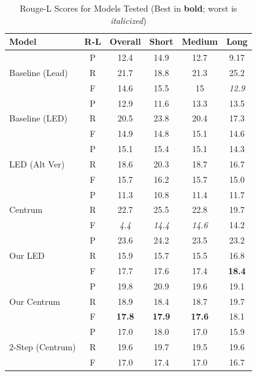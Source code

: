 \documentclass[12pt, twocolumn]{article}
\numberwithin{equation}{section}
\begin{document}
\begin{table}
    \centering
    \footnotesize
    \begin{tabular}{|p{1.5cm}|c|c|c|c|c|}
    \hline
        Model & R-L & Overall & Short & Medium & Long \\ \hline
        \multirow{3}{1.5cm}{Baseline (Lead)}
	& P & 12.4 & 14.9 & 12.7 & 9.17 \\ \cline{2-6}
        & R & 21.7 & 18.8 & 21.3 & 25.2 \\ \cline{2-6}
        & F & 14.6 & 15.5 & 15 & \textit{12.9} \\ \hline
        \multirow{3}{1.5cm}{Baseline (LED)} 
	& P & 12.9 & 11.6 & 13.3 & 13.5 \\ \cline{2-6}
        & R & 20.5 & 23.8 & 20.4 & 17.3 \\ \cline{2-6}
        & F & 14.9 & 14.8 & 15.1 & 14.6 \\ \hline
        \multirow{3}{1.5cm}{LED (Alt Ver)} 
	& P & 15.1 & 15.4 & 15.1 & 14.3 \\ \cline{2-6}
        & R & 18.6 & 20.3 & 18.7 & 16.7 \\ \cline{2-6}
        & F & 15.7 & 16.2 & 15.7 & 15.0 \\ \hline
        \multirow{3}{1.5cm}{Centrum} 
	& P & 11.3 & 10.8 & 11.4 & 11.7 \\ \cline{2-6}
        & R & 22.7 & 25.5 & 22.8 & 19.7 \\ \cline{2-6}
        & F & \textit{4.4} & \textit{14.4} & \textit{14.6} & 14.2 \\ \hline
        \multirow{3}{1.5cm}{Our LED} 
	& P & 23.6 & 24.2 & 23.5 & 23.2 \\ \cline{2-6}
        & R & 15.9 & 15.7 & 15.5 & 16.8 \\ \cline{2-6}
        & F & 17.7 & 17.6 & 17.4 & \textbf{18.4} \\ \hline
        \multirow{3}{1.5cm}{Our Centrum} 
	& P & 19.8 & 20.9 & 19.6 & 19.1 \\ \cline{2-6}
        & R & 18.9 & 18.4 & 18.7 & 19.7 \\ \cline{2-6}
        & F & \textbf{17.8} & \textbf{17.9} & \textbf{17.6} & 18.1 \\ \hline
        \multirow{3}{1.5cm}{2-Step (Centrum)} 
	& P & 17.0 & 18.0 & 17.0 & 15.9 \\ \cline{2-6}
        & R & 19.6 & 19.7 & 19.5 & 19.6 \\ \cline{2-6}
        & F & 17.0 & 17.4 & 17.0 & 16.7 \\ \hline
    \end{tabular}
    \caption{Rouge-L Scores for Models Tested (Best in \textbf{bold}; worst is \textit{italicized})}
    \label{tab:rouge-l}
\end{table}
\end{document}
